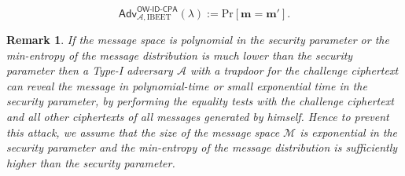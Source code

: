 \documentclass[runningheads]{llncs}
\newtheorem{rem}[thm]{Remark}
\def\cal{\mathcal}
\def\bf{\mathbf}
\def\Pr{\mathrm{Pr}}
\def\Adv{\mathsf{Adv}}
\def\OW{\textsf{OW-ID-CPA}}
\begin{document}
	$$\Adv^{\OW}_{\cal{A},\text{IBEET}}(\lambda):=\Pr[\bf{m}=\bf{m}'].$$
	\begin{rem}
		If the message space is polynomial in the security parameter or the min-entropy of the message distribution is much lower than the security parameter then a Type-I adversary $\cal{A}$ with a trapdoor for the challenge ciphertext can reveal the message in polynomial-time or small exponential time in the security parameter, by performing the equality tests with the challenge ciphertext and all other ciphertexts of all messages generated by himself. Hence to prevent this attack, we assume that the size of the message space $\cal{M}$ is exponential in the security parameter and the min-entropy of the message distribution is sufficiently higher than the security parameter.
	\end{rem}
	
\end{document}
